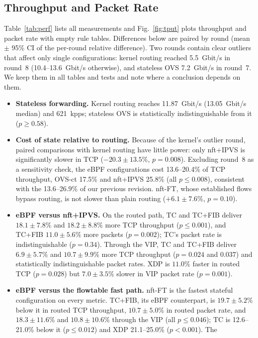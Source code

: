 \documentclass[conference]{IEEEtran}
\begin{document}
\subsection{Throughput and Packet Rate}
\label{sec:tput}
Table~\ref{tab:perf} lists all measurements and Fig.~\ref{fig:tput} plots
throughput and packet rate with empty rule tables. Differences below are
paired by round (mean $\pm$ 95\% CI of the per-round relative difference).
Two rounds contain clear outliers that affect only single configurations:
kernel routing reached 5.5~Gbit/s in round~8 (10.4--13.6~Gbit/s otherwise),
and stateless OVS 7.2~Gbit/s in round~7. We keep them in all tables and tests
and note where a conclusion depends on them.
\begin{itemize}
\item \textbf{Stateless forwarding.} Kernel routing reaches 11.87~Gbit/s
(13.05~Gbit/s median) and 621~kpps; stateless OVS is statistically
indistinguishable from it ($p \ge 0.58$).
\item \textbf{Cost of state relative to routing.} Because of the kernel's
outlier round, paired comparisons with kernel routing have little power: only
nft+IPVS is significantly slower in TCP ($-20.3 \pm 13.5\%$, $p=0.008$).
Excluding round~8 as a sensitivity check, the eBPF configurations cost
13.6--20.4\% of TCP throughput, OVS-ct 17.5\% and nft+IPVS 25.8\% (all
$p \le 0.008$), consistent with the 13.6--26.9\% of our previous revision.
nft-FT, whose established flows bypass routing, is not slower than plain
routing ($+6.1 \pm 7.6\%$, $p=0.10$).
\item \textbf{eBPF versus nft+IPVS.} On the routed path, TC and TC+FIB
deliver $18.1 \pm 7.8\%$ and $18.2 \pm 8.8\%$ more TCP throughput
($p \le 0.001$), and TC+FIB $11.0 \pm 5.6\%$ more packets ($p=0.002$); TC's
packet rate is indistinguishable ($p=0.34$). Through the VIP, TC and TC+FIB
deliver $6.9 \pm 5.7\%$ and $10.7 \pm 9.9\%$ more TCP throughput ($p=0.024$
and $0.037$) and statistically indistinguishable packet rates. XDP is
$11.0\%$ faster in routed TCP ($p=0.028$) but $7.0 \pm 3.5\%$ slower in VIP
packet rate ($p=0.001$).
\item \textbf{eBPF versus the flowtable fast path.} nft-FT is the fastest
stateful configuration on every metric. TC+FIB, its eBPF counterpart, is
$19.7 \pm 5.2\%$ below it in routed TCP throughput, $10.7 \pm 5.0\%$ in
routed packet rate, and $18.3 \pm 11.6\%$ and $10.8 \pm 10.6\%$ through the
VIP (all $p \le 0.046$); TC is 12.6--21.0\% below it ($p \le 0.012$) and
XDP 21.1--25.0\% ($p<0.001$). The

\end{itemize}
\end{document}
